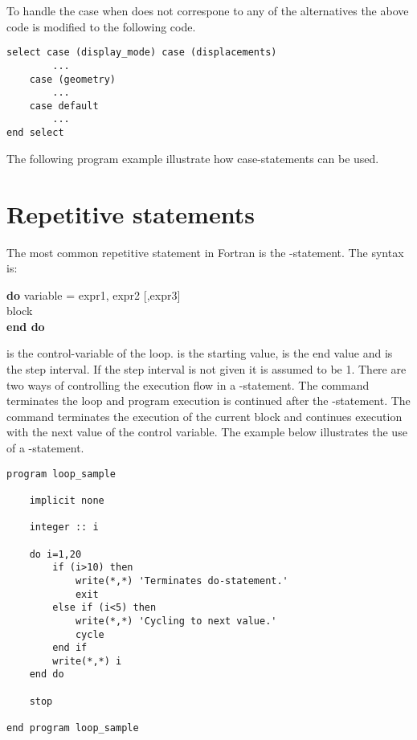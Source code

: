 To handle the case when  does not correspone to any of the alternatives the above code is modified to the following code.

\begin{lstlisting}
select case (display_mode) case (displacements)
        ...
    case (geometry)
        ...
    case default
        ...
end select
\end{lstlisting}

The following program example illustrate how case-statements can be used.



\section{Repetitive statements}

The most common repetitive statement in Fortran is the -statement. The syntax is:

\begin{fsyntax}
\textbf{do} variable = expr1, expr2 [,expr3]\\
\ftab block\\
\textbf{end do}
\end{fsyntax}

 is the control-variable of the loop.  is the starting value,  is the end value and  is the step interval. If the step interval is not given it is assumed to be 1. There are two ways of controlling the execution flow in a -statement. The  command terminates the loop and program execution is continued after the -statement. The  command terminates the execution of the current block and continues execution with the next value of the control variable. The example below illustrates the use of a -statement.

\begin{lstlisting}[texcl]
program loop_sample

    implicit none

    integer :: i

    do i=1,20
        if (i>10) then
            write(*,*) 'Terminates do-statement.'
            exit
        else if (i<5) then
            write(*,*) 'Cycling to next value.'
            cycle
        end if
        write(*,*) i
    end do

    stop

end program loop_sample
\end{lstlisting}

